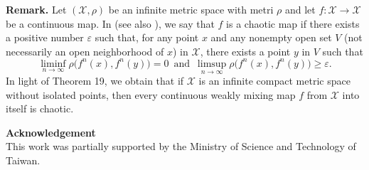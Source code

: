 \documentclass[12pt]{article}
\newcommand{\va}{\varepsilon}
\begin{document}
\noindent
{\bf Remark.}
Let $(\mathcal X, \rho)$ be an infinite metric space with metri $\rho$ and let $f : \mathcal X \longrightarrow \mathcal X$ be a continuous map.  In {\bf\cite{du3,du4,v2,v1}} (see also {\bf\cite{wang}}), we say that $f$ is a chaotic map if there exists a positive number $\va$ such that, for any point $x$ and any nonempty open set $V$ (not necessarily an open neighborhood of $x$) in $\mathcal X$, there exists a point $y$ in $V$ such that
$$
\liminf_{n \to \infty} \rho\big(f^n(x), f^n(y)\big) = 0 \,\,\, \text{and} \,\,\, \limsup_{n \to \infty} \rho\big(f^n(x), f^n(y)\big) \ge \va.
$$
In light of Theorem 19, we obtain that if $\mathcal X$ is an infinite compact metric space without isolated points, then every continuous weakly mixing map $f$ from $\mathcal X$ into itself is chaotic.  

\noindent
{\bf Acknowledgement}\\
This work was partially supported by the Ministry of Science and Technology of Taiwan.

%
%

\end{document}
